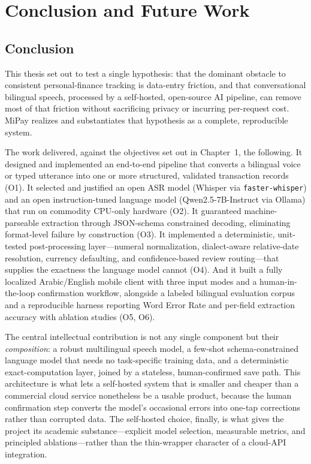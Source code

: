 \chapter{Conclusion and Future Work}

\setlength{\parindent}{1em}

\section{Conclusion}

This thesis set out to test a single hypothesis: that the dominant obstacle to
consistent personal-finance tracking is data-entry friction, and that
conversational bilingual speech, processed by a self-hosted, open-source AI
pipeline, can remove most of that friction without sacrificing privacy or
incurring per-request cost. MiPay realizes and substantiates that hypothesis as a
complete, reproducible system.

The work delivered, against the objectives set out in Chapter~1, the following.
It designed and implemented an end-to-end pipeline that converts a bilingual
voice or typed utterance into one or more structured, validated transaction
records (O1). It selected and justified an open ASR model (Whisper via
\texttt{faster-whisper}) and an open instruction-tuned language model
(Qwen2.5-7B-Instruct via Ollama) that run on commodity CPU-only hardware (O2). It
guaranteed machine-parseable extraction through JSON-schema constrained decoding,
eliminating format-level failure by construction (O3). It implemented a
deterministic, unit-tested post-processing layer---numeral normalization,
dialect-aware relative-date resolution, currency defaulting, and confidence-based
review routing---that supplies the exactness the language model cannot (O4). And
it built a fully localized Arabic/English mobile client with three input modes and
a human-in-the-loop confirmation workflow, alongside a labeled bilingual
evaluation corpus and a reproducible harness reporting Word Error Rate and
per-field extraction accuracy with ablation studies (O5, O6).

The central intellectual contribution is not any single component but their
\emph{composition}: a robust multilingual speech model, a few-shot
schema-constrained language model that needs no task-specific training data, and
a deterministic exact-computation layer, joined by a stateless, human-confirmed
save path. This architecture is what lets a self-hosted system that is smaller
and cheaper than a commercial cloud service nonetheless be a usable product,
because the human confirmation step converts the model's occasional errors into
one-tap corrections rather than corrupted data. The self-hosted choice, finally,
is what gives the project its academic substance---explicit model selection,
measurable metrics, and principled ablations---rather than the thin-wrapper
character of a cloud-API integration.

